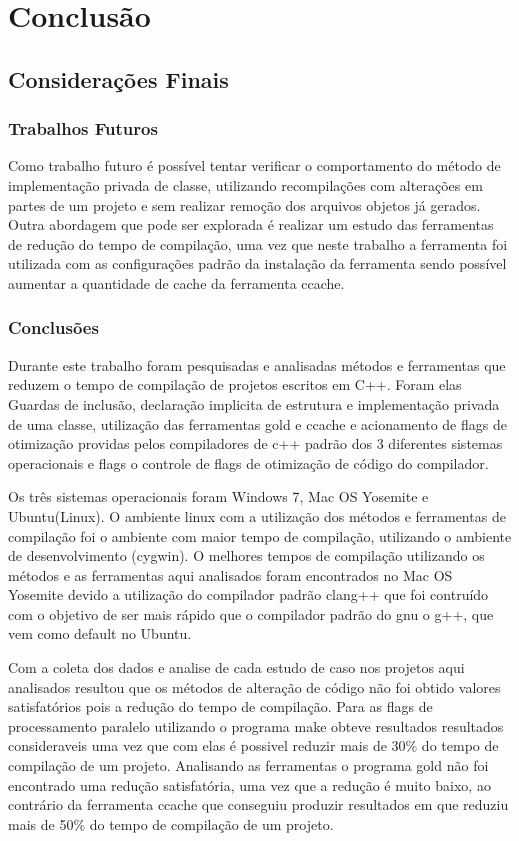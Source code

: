 \part{Conclusão}

\chapter[Considerações Finais]{Considerações Finais}

\section{Trabalhos Futuros}
	Como trabalho futuro é possível tentar verificar o comportamento do método de implementação
 privada de classe, utilizando recompilações com alterações em partes de um projeto e sem
 realizar remoção dos arquivos objetos já gerados.
	Outra abordagem que pode ser explorada é realizar um estudo das ferramentas de redução do
 tempo de compilação, uma vez que neste trabalho a ferramenta foi utilizada com as configurações
 padrão da instalação da ferramenta sendo possível aumentar a quantidade de cache
 da ferramenta ccache.

\section{Conclusões}

	Durante este trabalho foram pesquisadas e analisadas métodos e ferramentas que reduzem
 o tempo de compilação de projetos escritos em C++. Foram elas Guardas de inclusão,
 declaração implicita de estrutura e implementação privada de uma classe,  utilização das
 ferramentas gold e ccache e acionamento de flags de otimização providas pelos
 compiladores de c++ padrão dos 3 diferentes sistemas operacionais e flags o controle de
 flags de otimização de código do compilador.

	Os três sistemas operacionais foram Windows 7, Mac OS Yosemite e Ubuntu(Linux). O ambiente
 linux com a utilização dos métodos e ferramentas de compilação foi o ambiente com maior
 tempo de compilação, utilizando o ambiente de desenvolvimento (cygwin). O melhores tempos de
 compilação utilizando os métodos e as ferramentas aqui analisados foram encontrados no
 Mac OS Yosemite devido a utilização do compilador padrão clang++ que foi
 contruído com o objetivo de ser mais rápido que o compilador padrão do gnu o g++, que vem
 como default no Ubuntu.

    Com a coleta dos dados e analise de cada estudo de caso nos projetos aqui analisados resultou que
 os métodos de alteração de código não foi obtido valores satisfatórios pois a redução do
 tempo de compilação. Para as flags de processamento paralelo utilizando o programa make
 obteve resultados resultados consideraveis uma vez que com elas é possivel reduzir mais
 de 30\% do tempo de compilação de um projeto. Analisando as ferramentas o programa gold
 não foi encontrado uma redução satisfatória, uma vez que a redução é muito baixo, ao
 contrário da ferramenta ccache que conseguiu produzir resultados em que reduziu mais
 de 50\% do tempo de compilação de um projeto.


